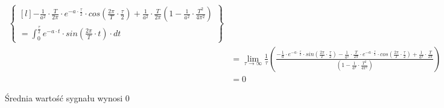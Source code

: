 \begin{align*}
\begin{Bmatrix*}[l]
{ -\frac{1}{a^2} \cdot \frac{T}{2\pi} \cdot 
 e^{-a\cdot \frac{\tau}{2}} \cdot cos \left(\frac{2\pi}{T}\cdot \frac{\tau}{2}\right) + \frac{1}{a^2}\cdot \frac{T}{2\pi}}
 {\left(1 - \frac{1}{a^2}\cdot \frac{T^2}{4\pi^2}\right)}
 \\
 = \int_{0}^{\frac{\tau}{2}} e^{-a\cdot t} \cdot  sin\left(\frac{2\pi}{T}\cdot t\right)\cdot dt
 \end{Bmatrix*}\\
 &=\lim_{\tau \rightarrow \infty }\frac{1}{\tau}\left(\frac{-\frac{1}{a}\cdot e^{-a\cdot \frac{\tau}{2}} \cdot sin \left(\frac{2\pi}{T}\cdot \frac{\tau}{2}\right)
   -\frac{1}{a^2} \cdot \frac{T}{2\pi} \cdot 
   e^{-a\cdot \frac{\tau}{2}} \cdot cos \left(\frac{2\pi}{T}\cdot \frac{\tau}{2}\right) + \frac{1}{a^2}\cdot \frac{T}{2\pi}}
 {\left(1 - \frac{1}{a^2}\cdot \frac{T^2}{4\pi^2}\right)} \right)\\
 &=0
\end{align*}

Średnia wartość sygnału wynosi $0$
\newpage
